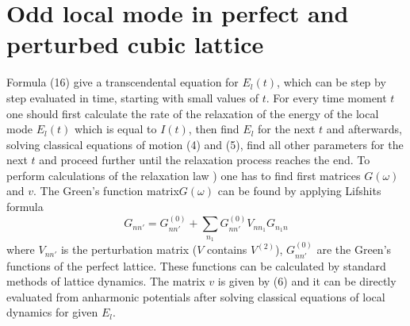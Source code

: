 \section{Odd local mode in perfect and perturbed cubic lattice}
Formula (16) give a transcendental equation for $E_{l}(t)$, which can be step 
by step evaluated in time, starting with small values of $t$. For every time
moment $t$ one should first calculate the rate of the relaxation of the
energy of the local mode $E_{l}(t)$ which is equal to $I(t)$, then find 
$E_{l}$ for the next $t$ and afterwards, solving classical equations of
motion (4) and (5), find all other parameters for the next $t$ and proceed
further until the relaxation process reaches the end.
To perform calculations of the relaxation law ) one has to find first matrices 
$G(\omega)$ and $v$. The Green's function matrix$G(\omega)$ 
can be found by applying Lifshits formula
\begin{equation}
G_{nn'} = G_{nn'}^{(0)} + \sum_{n_1} G^{(0)}_{nn'}V_{nn_1}G_{n_{1} n}
\end{equation}
where $V_{nn'}$ is the perturbation matrix ($V$ contains $V^{(2)}$),
$G_{nn'}^{(0)}$
are the Green's functions of the perfect lattice. 
These functions can be calculated by standard methods of
lattice dynamics. The matrix $v$ is given by (6) and it can be directly
evaluated from anharmonic potentials after solving classical equations of
local dynamics for given $E_l$. 

